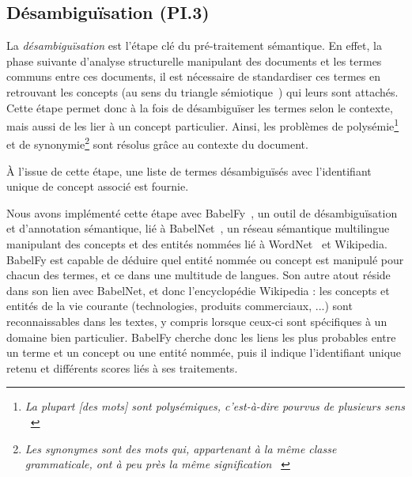 \clearpage %
\newpage   %

\subsection{Désambiguïsation (PI.3)}
\label{subsection:CREA:PI.4-Desambiguisation}

La \textit{désambiguïsation} est l'étape clé du pré-traitement sémantique.
En effet, la phase suivante d'analyse structurelle manipulant des documents et les termes communs entre ces documents, il est nécessaire de standardiser ces termes en retrouvant les concepts (au sens du triangle sémiotique~\cite{zargayouna2015recherche}) qui leurs sont attachés.
Cette étape permet donc à la fois de désambiguïser les termes selon le contexte, mais aussi de les lier à un concept particulier.
Ainsi, les problèmes de polysémie\footnote{\og \textit{La plupart [des mots] sont polysémiques, c'est-à-dire pourvus de plusieurs sens} \fg~\cite{goosse2016bon} } et de synonymie\footnote{\og \textit{Les synonymes sont des mots qui, appartenant à la même classe grammaticale, ont à peu près la même signification} \fg~\cite{goosse2016bon} } sont résolus grâce au contexte du document.

À l'issue de cette étape, une liste de termes désambiguïsés avec l'identifiant unique de concept associé est fournie.

\bigskip

Nous avons implémenté cette étape avec BabelFy~\cite{moro2014entity}\cite{moro2014multilingual}, un outil de désambiguïsation et d'annotation sémantique, lié à BabelNet~\cite{navigli2012babelnet}, un réseau sémantique multilingue manipulant des concepts et des entités nommées lié à WordNet~\cite{miller1995wordnet} et Wikipedia.
BabelFy est capable de déduire quel entité nommée ou concept est manipulé pour chacun des termes, et ce dans une multitude de langues.
Son autre atout réside dans son lien avec BabelNet, et donc l'encyclopédie Wikipedia : les concepts et entités de la vie courante (technologies, produits commerciaux, ...) sont reconnaissables dans les textes, y compris lorsque ceux-ci sont spécifiques à un domaine bien particulier.
BabelFy cherche donc les liens les plus probables entre un terme et un concept ou une entité nommée, puis il indique l'identifiant unique retenu et différents scores liés à ses traitements.

